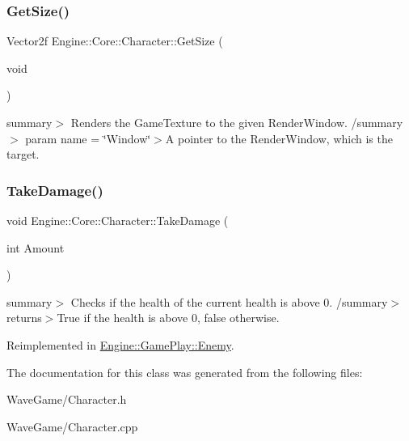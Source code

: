 \subsubsection{\texorpdfstring{Get\+Size()}{GetSize()}}
{\footnotesize\ttfamily Vector2f Engine\+::\+Core\+::\+Character\+::\+Get\+Size (\begin{DoxyParamCaption}\item[{void}]{ }\end{DoxyParamCaption})}

summary$>$ Renders the Game\+Texture to the given Render\+Window. /summary$>$ param name = \char`\"{}\+Window\char`\"{}$>$A pointer to the Render\+Window, which is the target.\mbox{\label{class_engine_1_1_core_1_1_character_a2156c371584ca6a8d2961154f1b49c09}} 
\subsubsection{\texorpdfstring{Take\+Damage()}{TakeDamage()}}
{\footnotesize\ttfamily void Engine\+::\+Core\+::\+Character\+::\+Take\+Damage (\begin{DoxyParamCaption}\item[{int}]{Amount }\end{DoxyParamCaption})\hspace{0.3cm}{\ttfamily [virtual]}}

summary$>$ Checks if the health of the current health is above 0. /summary$>$ returns$>$True if the health is above 0, false otherwise.

Reimplemented in \hyperlink{class_engine_1_1_game_play_1_1_enemy_a0eec9ea5a61636db10b5f02f9e74189a}{Engine\+::\+Game\+Play\+::\+Enemy}.



The documentation for this class was generated from the following files\+:\begin{DoxyCompactItemize}
\item 
Wave\+Game/Character.\+h\item 
Wave\+Game/Character.\+cpp\end{DoxyCompactItemize}
